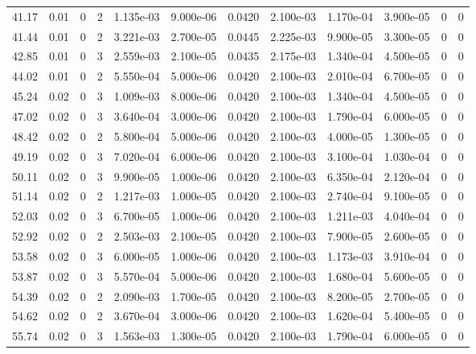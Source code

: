 \documentclass[preview]{standalone}
\begin{document}
{{{\begin{tabular}{L{1.2cm}C{1.2cm} C{0.3cm}C{0.5cm} C{1.4cm}C{1.4cm} C{1.4cm}C{1.4cm} C{1.6cm}C{1.6cm} C{1.6cm}C{1.6cm}}
  41.17  &  0.01  & 0     &  2 &  1.135e-03  & 9.000e-06  &  0.0420&   2.100e-03& 1.170e-04 & 3.900e-05   &  0 & 0  \\ 
  41.44  &  0.01  & 0     &  2 &  3.221e-03  & 2.700e-05  &  0.0445&   2.225e-03& 9.900e-05 & 3.300e-05   &  0 & 0  \\ 
  42.85  &  0.01  & 0     &  3 &  2.559e-03  & 2.100e-05  &  0.0435&   2.175e-03& 1.340e-04 & 4.500e-05   &  0 & 0  \\ 
  44.02  &  0.01  & 0     &  2 &  5.550e-04  & 5.000e-06  &  0.0420&   2.100e-03& 2.010e-04 & 6.700e-05   &  0 & 0  \\ 
  45.24  &  0.02  & 0     &  3 &  1.009e-03  & 8.000e-06  &  0.0420&   2.100e-03& 1.340e-04 & 4.500e-05   &  0 & 0  \\ 
  47.02  &  0.02  & 0     &  3 &  3.640e-04  & 3.000e-06  &  0.0420&   2.100e-03& 1.790e-04 & 6.000e-05   &  0 & 0  \\ 
  48.42  &  0.02  & 0     &  2 &  5.800e-04  & 5.000e-06  &  0.0420&   2.100e-03& 4.000e-05 & 1.300e-05   &  0 & 0  \\ 
  49.19  &  0.02  & 0     &  3 &  7.020e-04  & 6.000e-06  &  0.0420&   2.100e-03& 3.100e-04 & 1.030e-04   &  0 & 0  \\ 
  50.11  &  0.02  & 0     &  3 &  9.900e-05  & 1.000e-06  &  0.0420&   2.100e-03& 6.350e-04 & 2.120e-04   &  0 & 0  \\ 
  51.14  &  0.02  & 0     &  2 &  1.217e-03  & 1.000e-05  &  0.0420&   2.100e-03& 2.740e-04 & 9.100e-05   &  0 & 0  \\ 
  52.03  &  0.02  & 0     &  3 &  6.700e-05  & 1.000e-06  &  0.0420&   2.100e-03& 1.211e-03 & 4.040e-04   &  0 & 0  \\ 
  52.92  &  0.02  & 0     &  2 &  2.503e-03  & 2.100e-05  &  0.0420&   2.100e-03& 7.900e-05 & 2.600e-05   &  0 & 0  \\ 
  53.58  &  0.02  & 0     &  3 &  6.000e-05  & 1.000e-06  &  0.0420&   2.100e-03& 1.173e-03 & 3.910e-04   &  0 & 0  \\ 
  53.87  &  0.02  & 0     &  3 &  5.570e-04  & 5.000e-06  &  0.0420&   2.100e-03& 1.680e-04 & 5.600e-05   &  0 & 0  \\ 
  54.39  &  0.02  & 0     &  2 &  2.090e-03  & 1.700e-05  &  0.0420&   2.100e-03& 8.200e-05 & 2.700e-05   &  0 & 0  \\ 
  54.62  &  0.02  & 0     &  2 &  3.670e-04  & 3.000e-06  &  0.0420&   2.100e-03& 1.620e-04 & 5.400e-05   &  0 & 0  \\ 
  55.74  &  0.02  & 0     &  3 &  1.563e-03  & 1.300e-05  &  0.0420&   2.100e-03& 1.790e-04 & 6.000e-05   &  0 & 0  \\ 

\end{tabular}}}}
\end{document}
